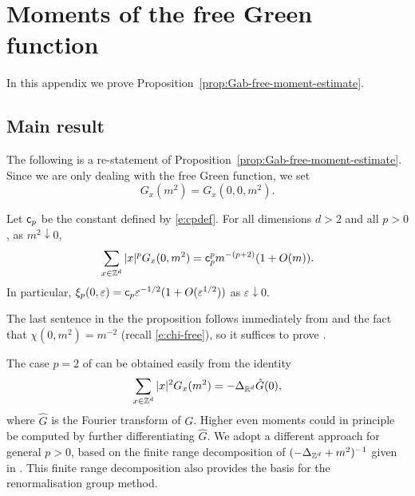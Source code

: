 \chapter{Moments of the free Green function}
\label{app:free-moments}

In this appendix we prove Proposition~\ref{prop:Gab-free-moment-estimate}.


\section{Main result}

The following is a re-statement of Proposition~\ref{prop:Gab-free-moment-estimate}.
Since we are only dealing with the free Green function, we set
\begin{equation}
G_x(m^2) = G_x(0, 0, m^2).
\end{equation}

\begin{prop}\label{prop:Gab-free-moment-estimate-bis}
Let ${\sf c}_p$ be the constant defined by \eqref{e:cpdef}.
For all dimensions $d>2$ and all $p>0$,
as $m^2 \downarrow 0$,
\begin{equation}
\label{e:Gab-free-moment-estimate-bis}
\sum_{x\in{ {{\mathbb Z}}^d }} |x|^p G_{x}(0, m^2)
=
{\sf c}_p^p m^{-(p + 2)} (1 + O(m)).
\end{equation}
In particular, $\xi_p(0,\varepsilon) = {\sf c}_p \varepsilon^{-1/2}
(1+O(\varepsilon^{1/2}))$ as $\varepsilon \downarrow 0$.
\end{prop}

The last sentence in the the proposition follows immediately from
 and the fact that $\chi(0,m^2)=m^{-2}$
(recall \eqref{e:chi-free}), so it suffices to prove .

The case $p = 2$ of 
can be obtained easily from the identity
\begin{equation}
\sum_{x\in{ {{\mathbb Z}}^d }} |x|^2 G_x(m^2) = -\Delta_{ {{\mathbb R}}^d} \hat{G}(0),
\end{equation}
where $\hat G$ is the Fourier transform of $G$.
Higher even moments could in principle
be computed by further differentiating $\hat G$.
We adopt a different approach
for general $p>0$,
based on the finite range decomposition of $(-\Delta_{{ {{\mathbb Z}}^d }}+m^2)^{-1}$
given in \cite{BGM04,Baue13a}.
This finite range decomposition also provides the basis for the renormalisation group method.

